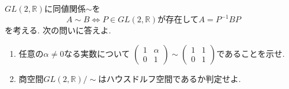 \documentclass[dvipdfmx,a4paper,11pt]{article}
\newcommand{\R}{\mathbb{R}}
\newcommand{\C}{\mathbb{C}}
\theoremstyle{definition}
\begin{document}
\begin{enumerate}[ label=\textbf{問}6.\arabic*]
$GL(2, \R) $に同値関係$\sim$を
$$
	A \sim B \Leftrightarrow \text{$P \in GL(2, \R)$が存在して$A = P^{-1} B P$}
	$$
を考える. 次の問いに答えよ.
	\begin{enumerate}
	\item 任意の$\alpha \neq 0$なる実数について
$\begin{pmatrix} 1& \alpha\\0& 1\end{pmatrix} \sim \begin{pmatrix} 1 & 1\\0& 1\end{pmatrix}$であることを示せ.
	\item 商空間$GL(2, \R)/\sim$はハウスドルフ空間であるか判定せよ.
	\end{enumerate}
	
 \end{enumerate}





 
\end{document}
